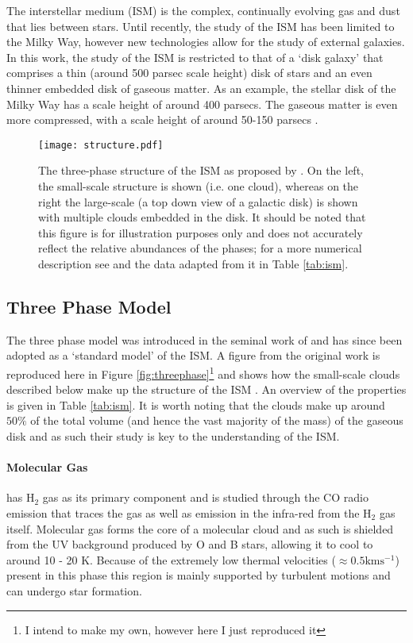 The interstellar medium (ISM) is the complex, continually evolving gas and dust that lies between stars.
Until recently, the study of the ISM has been limited to the Milky Way, however new technologies allow for the study of external galaxies.
In this work, the study of the ISM is restricted to that of a `disk galaxy' that comprises a thin (around 500 parsec scale height) disk of stars and an even thinner embedded disk of gaseous matter.
As an example, the stellar disk of the Milky Way has a scale height of around 400 parsecs. The gaseous matter is even more compressed, with a scale height of around 50-150 parsecs \citep{drimmel_three-dimensional_2001,kalberla_hi_2009}.

\begin{figure}
    \centering

    \texttt{[image: structure.pdf]}

    \caption{The three-phase structure of the ISM as proposed by \citet{mckee_theory_1977}.
    On the left, the small-scale structure is shown (i.e. one cloud), whereas on the right the large-scale (a top down view of a galactic disk) is shown with multiple clouds embedded in the disk. 
    It should be noted that this figure is for illustration purposes only and does not accurately reflect the relative abundances of the phases; for a more numerical description see \citet{ferriere_interstellar_2001} and the data adapted from it in Table \ref{tab:ism}.}
    \label{fig:struct}
\end{figure}


\subsection{Three Phase Model}

The three phase model was introduced in the seminal work of \citet{mckee_theory_1977} and has since been adopted as a `standard model' of the ISM. A figure from the original work is reproduced here in Figure \ref{fig:threephase}\footnote{I intend to make my own, however here I just reproduced it} and shows how the small-scale clouds described below make up the structure of the ISM \citep{ferriere_interstellar_2001}. An overview of the properties is given in Table \ref{tab:ism}. It is worth noting that the clouds make up around $50\%$ of the total volume (and hence the vast majority of the mass) of the gaseous disk and as such their study is key to the understanding of the ISM.

\paragraph{Molecular Gas} has H$_2$ gas as its primary component and is studied through the CO radio emission that traces the gas as well as emission in the infra-red from the H$_2$ gas itself. Molecular gas forms the core of a molecular cloud and as such is shielded from the UV background produced by O and B stars, allowing it to cool to around 10 - 20 K. Because of the extremely low thermal velocities ($\approx 0.5 \mathrm{km} \mathrm{s}^{-1}$) present in this phase this region is mainly supported by turbulent motions and can undergo star formation.

